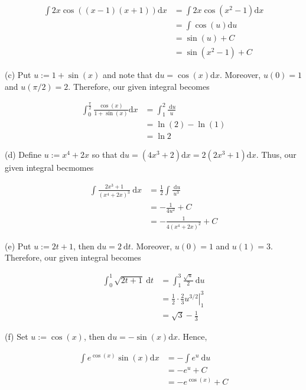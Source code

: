 \documentclass[10pt]{article}
\begin{document}
$$
\begin{aligned}
\int 2 x \cos ((x-1)(x+1)) \mathrm{d} x & =\int 2 x \cos \left(x^{2}-1\right) \mathrm{d} x \\
& =\int \cos (u) \mathrm{d} u \\
& =\sin (u)+C \\
& =\sin \left(x^{2}-1\right)+C
\end{aligned}
$$

(c) Put $u:=1+\sin (x)$ and note that $\mathrm{d} u=\cos (x) \mathrm{d} x$. Moreover, $u(0)=1$ and $u(\pi / 2)=2$. Therefore, our given integral becomes

$$
\begin{aligned}
\int_{0}^{\frac{\pi}{2}} \frac{\cos (x)}{1+\sin (x)} \mathrm{d} x & =\int_{1}^{2} \frac{\mathrm{~d} u}{u} \\
& =\ln (2)-\ln (1) \\
& =\ln 2
\end{aligned}
$$

(d) Define $u:=x^{4}+2 x$ so that $\mathrm{d} u=\left(4 x^{3}+2\right) \mathrm{d} x=2\left(2 x^{3}+1\right) \mathrm{d} x$. Thus, our given integral becmomes

$$
\begin{aligned}
\int \frac{2 x^{3}+1}{\left(x^{4}+2 x\right)^{3}} \mathrm{~d} x & =\frac{1}{2} \int \frac{\mathrm{~d} u}{u^{3}} \\
& =-\frac{1}{4 u^{2}}+C \\
& =-\frac{1}{4\left(x^{4}+2 x\right)^{2}}+C
\end{aligned}
$$

(e) Put $u:=2 t+1$, then $\mathrm{d} u=2 \mathrm{~d} t$. Moreover, $u(0)=1$ and $u(1)=3$. Therefore, our given integral becomes

$$
\begin{aligned}
\int_{0}^{1} \sqrt{2 t+1} \mathrm{~d} t & =\int_{1}^{3} \frac{\sqrt{u}}{2} \mathrm{~d} u \\
& =\left.\frac{1}{2} \cdot \frac{2}{3} u^{3 / 2}\right|_{1} ^{3} \\
& =\sqrt{3}-\frac{1}{3}
\end{aligned}
$$

(f) Set $u:=\cos (x)$, then $\mathrm{d} u=-\sin (x) \mathrm{d} x$. Hence,

$$
\begin{aligned}
\int e^{\cos (x)} \sin (x) \mathrm{d} x & =-\int e^{u} \mathrm{~d} u \\
& =-e^{u}+C \\
& =-e^{\cos (x)}+C
\end{aligned}
$$
\end{document}

